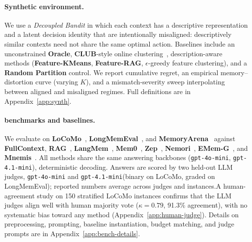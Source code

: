 \documentclass{article}
\theoremstyle{plain}
\theoremstyle{definition}
\theoremstyle{remark}
\begin{document}
\vspace{-0.3em}
\paragraph{Synthetic environment.}
We use a \emph{Decoupled Bandit} in which each context has a descriptive representation and a latent decision identity that are intentionally misaligned: descriptively similar contexts need not share the same optimal action.
Baselines include an unconstrained \textbf{Oracle}, \textbf{CLUB}-style online clustering~\citep{gentile2014onlineclusteringbandits}, description-aware methods (\textbf{Feature-KMeans}, \textbf{Feature-RAG}, $\epsilon$-greedy feature clustering), and a \textbf{Random Partition} control.
We report cumulative regret, an empirical memory--distortion curve (varying $K$), and a mismatch-severity sweep interpolating between aligned and misaligned regimes.
Full definitions are in Appendix~\ref{app:synth}.
\vspace{-0.5em}
\paragraph{benchmarks and baselines.}
We evaluate on \textbf{LoCoMo}~\citep{maharana-etal-2024-evaluating}, \textbf{LongMemEval}~\citep{wu2025longmemevalbenchmarkingchatassistants}, and \textbf{MemoryArena}~\citep{he2026memoryarenabenchmarkingagentmemory} against \textbf{FullContext}, \textbf{RAG}~\citep{lewis2021retrievalaugmentedgenerationknowledgeintensivenlp}, \textbf{LangMem}~\citep{langchain_langmem_2024}, \textbf{Mem0}~\citep{chhikara2025mem0buildingproductionreadyai}, \textbf{Zep}~\citep{rasmussen2025zeptemporalknowledgegraph}, \textbf{Nemori}~\citep{nan2025nemoriselforganizingagentmemory}, \textbf{EMem-G}~\citep{zhou2025simplestrongbaselinelongterm}, and \textbf{Mnemis}~\citep{tang2026mnemisdualrouteretrievalhierarchical}.
All methods share the same answering backbones (\texttt{gpt-4o-mini}, \texttt{gpt-4.1-mini}), deterministic decoding.
Answers are scored by two held-out LLM judges, \texttt{gpt-4o-mini}
and \texttt{gpt-4.1-mini}(binary on LoCoMo, graded on LongMemEval); reported numbers average across judges and instances.A human-agreement study on 150 stratified LoCoMo instances confirms
that the LLM judges align well with human majority vote
($\kappa = 0.79$, 91.3\% agreement), with no systematic bias toward
any method (Appendix~\ref{app:human-judge}).
Details on preprocessing, prompting, baseline instantiation, budget matching, and judge prompts are in Appendix~\ref{app:bench-details}.
\end{document}
